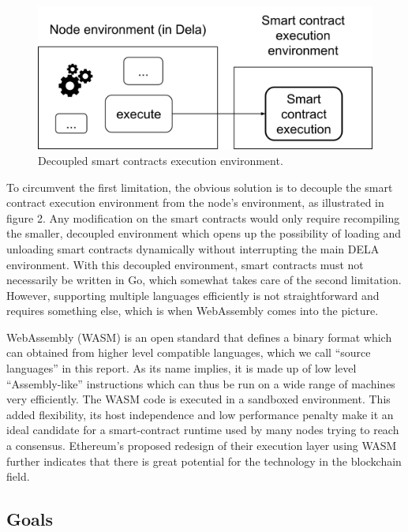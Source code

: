 \documentclass[11pt, a4paper, twoside, openright]{article}
\begin{document}
\begin{figure}[htbp]
 \centering
  \includegraphics[width=12cm]{wasm2.png}
  \caption{Decoupled smart contracts execution environment.}
\end{figure}

To circumvent the first limitation, the obvious solution is to decouple the smart contract execution environment from the node's environment, as illustrated in figure 2. Any modification on the smart contracts would only require recompiling the smaller, decoupled environment which opens up the possibility of loading and unloading smart contracts dynamically without interrupting the main DELA environment. With this decoupled environment, smart contracts must not necessarily be written in Go, which somewhat takes care of the second limitation. However, supporting multiple languages efficiently is not straightforward and requires something else, which is when WebAssembly comes into the picture.

WebAssembly (WASM) is an open standard that defines a binary format which can obtained from higher level compatible languages, which we call ``source languages'' in this report. As its name implies, it is made up of low level ``Assembly-like'' instructions which can thus be run on a wide range of machines very efficiently. The WASM code is executed in a sandboxed environment. This added flexibility, its host independence and low performance penalty make it an ideal candidate for a smart-contract runtime used by many nodes trying to reach a consensus. Ethereum's proposed redesign of their execution layer using WASM further indicates that there is great potential for the technology in the blockchain field. 

\subsection{Goals}
\label{Goals}
\end{document}
